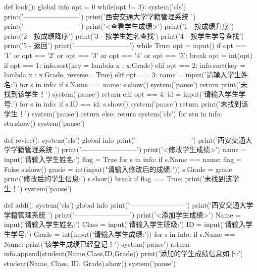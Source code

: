 \documentclass{article}
\begin{document}
\begin{python}
def look():
    global info
    opt = 0
    while(opt != 3):
        system('cls')
        print('------------------------')
        print('西安交通大学学籍管理系统     ')
        print('------------------------')
        print('<查看学生成绩>')
        print('1 - 按成绩升序')
        print('2 - 按成绩降序')
        print('3 - 按学生姓名查找')
        print('4 - 按学生学号查找')
        print('5 - 返回')
        print('------------------------')
        while True:
            opt = input()
            if opt == '1' or opt == '2' or opt == '3' or opt == '4' or opt == '5':
                break
        opt = int(opt)
        if opt == 1:
            info.sort(key = lambda x : x.Grade)
        elif opt == 2:
            info.sort(key = lambda x : x.Grade, reverse= True)
        elif opt == 3:
            name = input('请输入学生姓名:')
            for s in info:
                if s.Name == name:
                    s.show()
                    system('pause')
                    return
            print('未找到该学生！')
            system('pause')
            return
        elif opt == 4:
            id = input('请输入学生学号:')
            for s in info:
                if s.ID == id:
                    s.show()
                    system('pause')
                    return
            print('未找到该学生！')
            system('pause')
            return
        else:
            return
        system('cls')
        for stu in info:
            stu.show()
        system('pause')

def revise():
    system('cls')
    global info
    print('------------------------')
    print('西安交通大学学籍管理系统     ')
    print('------------------------')
    print('<修改学生成绩>')
    name = input('请输入学生姓名:')
    flag = True
    for s in info:
        if s.Name == name:
            flag = False
            s.show()
            grade = int(input("请输入修改后的成绩:"))
            s.Grade = grade
            print('修改后的学生信息:')
            s.show()
            break
    if flag == True:
        print('未找到该学生！')
    system('pause')

def add():
    system('cls')
    global info
    print('------------------------')
    print('西安交通大学学籍管理系统     ')
    print('------------------------')
    print('<添加学生成绩>')
    Name = input('请输入学生姓名:')
    Class = input('请输入学生班级:')
    ID = input('请输入学生学号:')
    Grade = int(input('请输入学生成绩:'))
    for s in info:
        if s.Name == Name:
            print('该学生成绩已经登记！')
            system('pause')
            return
    info.append(student(Name,Class,ID,Grade))
    print('添加的学生成绩信息如下:')
    student(Name, Class, ID, Grade).show()
    system('pause')


\end{python}
\end{document}

